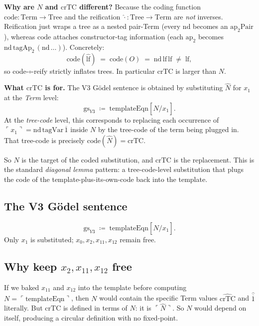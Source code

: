 \documentclass[11pt]{article}
\newcommand{\nat}[1]{\overline{#1}}
\newcommand{\code}[1]{\ulcorner #1 \urcorner}
\newcommand{\reify}[1]{\widehat{#1}}
\begin{document}
\medskip

\textbf{Why are $N$ and $\mathrm{crTC}$ different?}
Because the coding function $\mathrm{code} : \mathrm{Term} \to \mathrm{Tree}$
and the reification $\reify{\cdot} : \mathrm{Tree} \to \mathrm{Term}$
are \emph{not} inverses.  Reification just wraps a tree as a nested
pair-Term (every $\mathrm{nd}$ becomes an
$\mathrm{ap}_2\mathrm{Pair}$), whereas $\mathrm{code}$ attaches
constructor-tag information (each $\mathrm{ap}_2$ becomes
$\mathrm{nd}\,\mathrm{tagAp_2}\,(\mathrm{nd}\,\ldots)$).
Concretely:
\[
  \mathrm{code}(\reify{\mathrm{lf}}) \;=\; \mathrm{code}(O)
    \;=\; \mathrm{nd}\,\mathrm{lf}\,\mathrm{lf} \;\neq\; \mathrm{lf},
\]
so code-$\circ$-reify strictly inflates trees.  In particular
$\mathrm{crTC}$ is larger than $N$.

\medskip

\textbf{What $\mathrm{crTC}$ is for.}
The V3 G\"odel sentence is obtained by substituting $\reify{N}$ for
$x_1$ at the \emph{Term} level:
\[
  \mathrm{gs}_{V3} \;\coloneqq\; \mathrm{templateEqn}[\reify{N} / x_1].
\]
At the \emph{tree-code} level, this corresponds to replacing each
occurrence of $\code{x_1} = \mathrm{nd}\,\mathrm{tagVar}\,\nat{1}$
inside $N$ by the tree-code of the term being plugged in.  That
tree-code is precisely $\mathrm{code}(\reify{N}) = \mathrm{crTC}$.

So $N$ is the target of the coded substitution, and $\mathrm{crTC}$
is the replacement.  This is the standard \emph{diagonal lemma}
pattern: a tree-code-level substitution that plugs the code of
the template-plus-its-own-code back into the template.

\subsection{The V3 G\"odel sentence}

\[
  \mathrm{gs}_{V3} \;\coloneqq\; \mathrm{templateEqn}[\reify{N}/x_1].
\]
Only $x_1$ is substituted; $x_0, x_2, x_{11}, x_{12}$ remain free.

\subsection{Why keep $x_2, x_{11}, x_{12}$ free}
\label{subsec:why-free}

If we baked $x_{11}$ and $x_{12}$ into the template before computing
$N = \code{\mathrm{templateEqn}}$, then $N$ would contain the specific
Term values $\reify{\mathrm{crTC}}$ and $\reify{\nat{1}}$ literally.
But $\mathrm{crTC}$ is defined in terms of $N$: it is
$\code{\reify{N}}$.  So $N$ would depend on itself, producing a
circular definition with no fixed-point.
\end{document}
